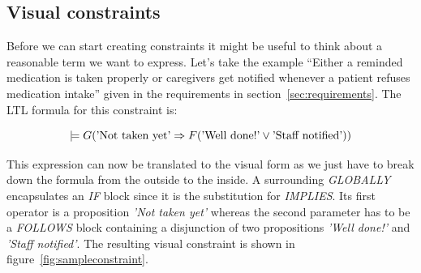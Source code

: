 \documentclass[conference]{IEEEtran}
\begin{document}











\subsection{Visual constraints}

Before we can start creating constraints it might be useful to think about a reasonable term we want to express. Let's take the example ``Either a reminded medication is taken properly or caregivers get notified whenever a patient refuses medication intake'' given in the requirements in section~\ref{sec:requirements}. The LTL formula for this constraint is:

\begin{equation} \label{eq:sampleconstraint}
  \models G (\textnormal{'Not taken yet'} \Rightarrow F (\textnormal{'Well done!'} \vee \textnormal{'Staff notified'}))
\end{equation}

This expression can now be translated to the visual form as we just have to break down the formula from the outside to the inside. A surrounding \emph{GLOBALLY} encapsulates an \emph{IF} block since it is the substitution for \emph{IMPLIES}. Its first operator is a proposition \emph{'Not taken yet'} whereas the second parameter has to be a \emph{FOLLOWS} block containing a disjunction of two propositions \emph{'Well done!'} and \emph{'Staff notified'}. The resulting visual constraint is shown in figure~\ref{fig:sampleconstraint}.
\end{document}
